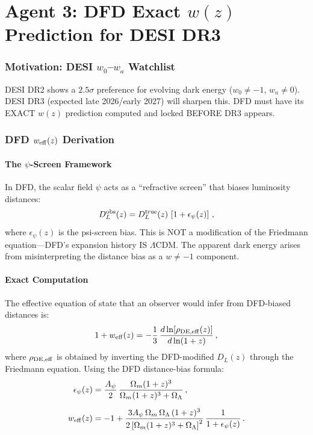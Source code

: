 \documentclass[11pt,a4paper]{article}
\begin{document}
\part{Agent 3: DFD Exact $w(z)$ Prediction for DESI DR3}
\label{part:desi-wz}

\section{Motivation: DESI $w_0$--$w_a$ Watchlist}

DESI DR2 shows a $2.5\sigma$ preference for evolving dark energy ($w_0 \neq -1$, $w_a \neq 0$). DESI DR3 (expected late 2026/early 2027) will sharpen this. DFD must have its EXACT $w(z)$ prediction computed and locked BEFORE DR3 appears.

\section{DFD $w_{\rm eff}(z)$ Derivation}

\subsection{The $\psi$-Screen Framework}

In DFD, the scalar field $\psi$ acts as a ``refractive screen'' that biases luminosity distances:
\begin{equation}
D_L^{\rm obs}(z) = D_L^{\rm true}(z)\,\left[1 + \epsilon_\psi(z)\right]\,,
\end{equation}
where $\epsilon_\psi(z)$ is the psi-screen bias. This is NOT a modification of the Friedmann equation---DFD's expansion history IS $\Lambda$CDM. The apparent dark energy arises from misinterpreting the distance bias as a $w \neq -1$ component.

\subsection{Exact Computation}

The effective equation of state that an observer would infer from DFD-biased distances is:
\begin{equation}
1 + w_{\rm eff}(z) = -\frac{1}{3}\,\frac{d\ln[\rho_{\rm DE,eff}(z)]}{d\ln(1+z)}\,,
\end{equation}
where $\rho_{\rm DE,eff}$ is obtained by inverting the DFD-modified $D_L(z)$ through the Friedmann equation. Using the DFD distance-bias formula:
\begin{align}
\epsilon_\psi(z) &= \frac{A_\psi}{2}\,\frac{\Omega_m(1+z)^3}{\Omega_m(1+z)^3 + \Omega_\Lambda}\,,\\[6pt]
w_{\rm eff}(z) &= -1 + \frac{3A_\psi\,\Omega_m\,\Omega_\Lambda\,(1+z)^3}{2\left[\Omega_m(1+z)^3 + \Omega_\Lambda\right]^2}\,\frac{1}{1 + \epsilon_\psi(z)}\,.
\end{align}
\end{document}
